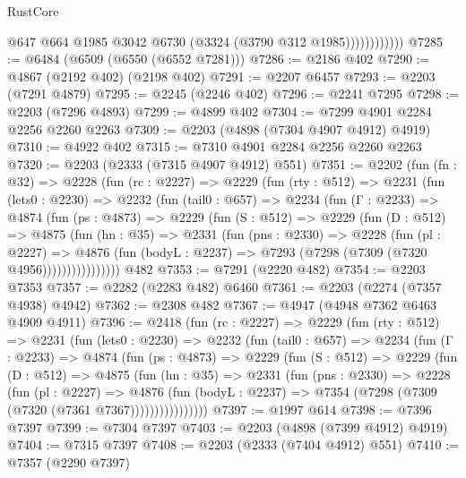 \begin{lexlean}{RustCore}
\begin{coremodule}
                        @647
                        @664
                        @1985
                        @3042
                        @6730
                        (@3324 (@3790 @312 @1985))))))))))))
@7285 := @6484 (@6509 (@6550 (@6552 @7281)))
@7286 := @2186 @402
@7290 := @4867 (@2192 @402) (@2198 @402)
@7291 := @2207 @6457
@7293 := @2203 (@7291 @4879)
@7295 := @2245 (@2246 @402)
@7296 := @2241 @7295
@7298 := @2203 (@7296 @4893)
@7299 := @4899 @402
@7304 := @7299 @4901 @2284 @2256 @2260 @2263
@7309 := @2203 (@4898 (@7304 @4907 @4912) @4919)
@7310 := @4922 @402
@7315 := @7310 @4901 @2284 @2256 @2260 @2263
@7320 := @2203 (@2333 (@7315 @4907 @4912) @551)
@7351 := @2202
    (fun (fn : @32) =>
    @2228
      (fun (rc : @2227) =>
      @2229
        (fun (rty : @512) =>
        @2231
          (fun (lets0 : @2230) =>
          @2232
            (fun (tail0 : @657) =>
            @2234
              (fun (Γ : @2233) =>
              @4874
                (fun (ps : @4873) =>
                @2229
                  (fun (S : @512) =>
                  @2229
                    (fun (D : @512) =>
                    @4875
                      (fun (hn : @35) =>
                      @2331
                        (fun (pns : @2330) =>
                        @2228
                          (fun (pl : @2227) =>
                          @4876
                            (fun (bodyL : @2237) => @7293 (@7298 (@7309 (@7320 @4956))))))))))))))))
    @482
@7353 := @7291 (@2220 @482)
@7354 := @2203 @7353
@7357 := @2282 (@2283 @482) @6460
@7361 := @2203 (@2274 (@7357 @4938) @4942)
@7362 := @2308 @482
@7367 := @4947 (@4948 @7362 @6463 @4909 @4911)
@7396 := @2418
    (fun (rc : @2227) =>
    @2229
      (fun (rty : @512) =>
      @2231
        (fun (lets0 : @2230) =>
        @2232
          (fun (tail0 : @657) =>
          @2234
            (fun (Γ : @2233) =>
            @4874
              (fun (ps : @4873) =>
              @2229
                (fun (S : @512) =>
                @2229
                  (fun (D : @512) =>
                  @4875
                    (fun (hn : @35) =>
                    @2331
                      (fun (pns : @2330) =>
                      @2228
                        (fun (pl : @2227) =>
                        @4876
                          (fun (bodyL : @2237) =>
                          @7354 (@7298 (@7309 (@7320 (@7361 @7367))))))))))))))))
@7397 := @1997 @614
@7398 := @7396 @7397
@7399 := @7304 @7397
@7403 := @2203 (@4898 (@7399 @4912) @4919)
@7404 := @7315 @7397
@7408 := @2203 (@2333 (@7404 @4912) @551)
@7410 := @7357 (@2290 @7397)

\end{coremodule}
\end{lexlean}

